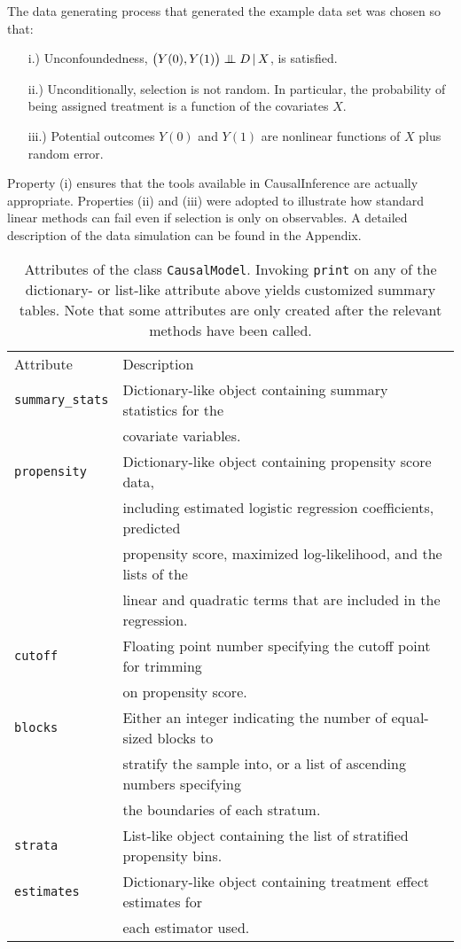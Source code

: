 \documentclass[12pt]{article}
\newcommand\independent{\protect\mathpalette{\protect\independenT}{\perp}}
\def\independenT#1#2{\mathrel{\setbox0\hbox{$#1#2$}%
\copy0\kern-\wd0\mkern4mu\box0}}  %
\theoremstyle{definition}
\theoremstyle{definition}
\theoremstyle{definition}
\theoremstyle{remark}
\begin{document}
The data generating process that generated the example data set was chosen so that:
\begin{itemize}
\item[i.)] Unconfoundedness, $\big(Y(0), Y(1)\big) \independent D \, | \, X$, is satisfied.
\item[ii.)] Unconditionally, selection is not random. In particular, the probability of being assigned treatment is a function of the covariates $X$.
\item[iii.)] Potential outcomes $Y(0)$ and $Y(1)$ are nonlinear functions of $X$ plus random error.
\end{itemize}

Property (i) ensures that the tools available in CausalInference are actually appropriate. Properties (ii) and (iii) were adopted to illustrate how standard linear methods can fail even if selection is only on observables. A detailed description of the data simulation can be found in the Appendix.

\begin{table}[h]
\begin{center}\begin{tabular}{ll}
Attribute & Description \\
\texttt{summary\_stats} & Dictionary-like object containing summary statistics for the \\
& covariate variables. \\
\texttt{propensity} & Dictionary-like object containing propensity score data, \\
& including estimated logistic regression coefficients, predicted \\
& propensity score, maximized log-likelihood, and the lists of the \\
& linear and quadratic terms that are included in the regression. \\
\texttt{cutoff} & Floating point number specifying the cutoff point for trimming \\
& on propensity score.\\
\texttt{blocks} & Either an integer indicating the number of equal-sized blocks to \\
& stratify the sample into, or a list of ascending numbers specifying \\
& the boundaries of each stratum. \\
\texttt{strata} & List-like object containing the list of stratified propensity bins. \\
\texttt{estimates} & Dictionary-like object containing treatment effect estimates for \\
& each estimator used.
\end{tabular}\end{center}
\caption{Attributes of the class \texttt{CausalModel}. Invoking \texttt{print} on any of the dictionary- or list-like attribute above yields customized summary tables. Note that some attributes are only created after the relevant methods have been called.}  \label{tab.a}
\end{table}
\end{document}
